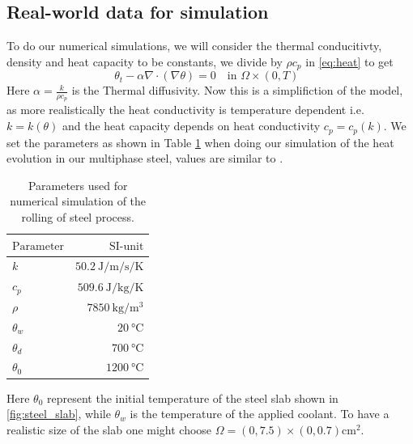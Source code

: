 \subsection{Real-world data for simulation}

To do our numerical simulations, we will consider the thermal conducitivty, density and heat capacity to be constants, we divide by $\rho c_p$ in \eqref{eq:heat} to get 
\begin{equation*}
    \theta_t - \alpha \nabla \cdot (\nabla \theta) = 0 \quad \text{in $\Omega \times (0,T)$ }
\end{equation*}
Here $\alpha = \frac{k}{\rho c_p}$ is the Thermal diffusivity. Now this is a simplifiction of the model, as more realistically the heat conductivity is temperature dependent i.e. $k = k(\theta)$ and the heat capacity depends on heat conductivity $c_p = c_p(k)$. We set the parameters as shown in Table \ref{tab:chosenParam} when doing our simulation of the heat evolution in our multiphase steel, values are similar to \cite{DPSteel}. 
\begin{table}[h]
    \centering
    \caption{Parameters used for numerical simulation of the rolling of steel process.}
    \begin{tabular}{@{}lr@{}} \toprule
    $\text{Parameter}$ & $\text{SI-unit}$ \\
    \midrule
       $k$& $\SI{50.2}{\joule\per\metre\per\second\per\kelvin}$ \\
        $c_p$ & $\SI{509.6}{\joule\per\kilogram\per\kelvin}$ \\
        $\rho$ & $\SI{7850}{\kilogram\per\metre\cubed}$ \\
        $\theta_w$ & $\SI{20}{\celsius}$ \\
        $\theta_d$ & $\SI{700}{\celsius}$ \\
        $\theta_0$ & $\SI{1200}{\celsius}$ \\ \bottomrule
    \end{tabular}
    \label{tab:chosenParam}
\end{table}
Here $\theta_0$ represent the initial temperature of the steel slab shown in \ref{fig:steel_slab}, while $\theta_w$ is the temperature of the applied coolant. To have a realistic size of the slab one might choose $\Omega = (0,7.5)\times(0,0.7) \text{cm}^2$.

